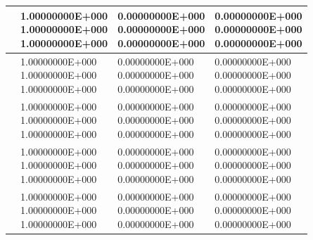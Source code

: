 \begin{table}
\begin{tabularx}{1.0\textwidth}{| >{\raggedright\arraybackslash}X | >{\raggedright\arraybackslash}X | >{\raggedright\arraybackslash}X |>{\raggedright\arraybackslash}X |}
		\centering{($1.5; 1.5; 0.5$)} & \centering{1.00000000E+000 \\ 1.00000000E+000\\
			1.00000000E+000}& \centering{0.00000000E+000 \\ 0.00000000E+000 \\ 0.00000000E+000} & \centering{0.00000000E+000 \\ 0.00000000E+000 \\ 0.00000000E+000} \tabularnewline \hline
			
		\centering{($0.5; 0.5; 1.5$)} & \centering{1.00000000E+000 \\ 1.00000000E+000\\
			1.00000000E+000}& \centering{0.00000000E+000 \\ 0.00000000E+000 \\ 0.00000000E+000} & \centering{0.00000000E+000 \\ 0.00000000E+000 \\ 0.00000000E+000} \tabularnewline \hline
		
		\centering{($1.5; 0.5; 1.5$)} & \centering{1.00000000E+000 \\ 1.00000000E+000\\
			1.00000000E+000}& \centering{0.00000000E+000 \\ 0.00000000E+000 \\ 0.00000000E+000} & \centering{0.00000000E+000 \\ 0.00000000E+000 \\ 0.00000000E+000} \tabularnewline \hline
		
		\centering{($0.5; 1.5; 1.5$)} & \centering{1.00000000E+000 \\ 1.00000000E+000\\
			1.00000000E+000}& \centering{0.00000000E+000 \\ 0.00000000E+000 \\ 0.00000000E+000} & \centering{0.00000000E+000 \\ 0.00000000E+000 \\ 0.00000000E+000} \tabularnewline \hline
		
		\centering{($1.5; 1.5; 1.5$)} & \centering{1.00000000E+000 \\ 1.00000000E+000\\
			1.00000000E+000}& \centering{0.00000000E+000 \\ 0.00000000E+000 \\ 0.00000000E+000} & \centering{0.00000000E+000 \\ 0.00000000E+000 \\ 0.00000000E+000} \tabularnewline \hline
	
	\end{tabularx}
	\label{tab:test10}
\end{table}

